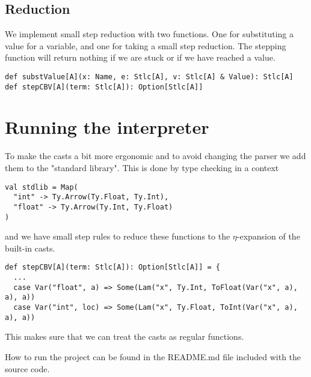 \documentclass[11pt]{article}
\begin{document}
\subsection{Reduction}
We implement small step reduction with two functions. One for substituting a value for a variable, and one for taking a small step reduction. The stepping function will return nothing if we are stuck or if we have reached a value.
\begin{lstlisting}
def substValue[A](x: Name, e: Stlc[A], v: Stlc[A] & Value): Stlc[A]
def stepCBV[A](term: Stlc[A]): Option[Stlc[A]]
\end{lstlisting}

\section{Running the interpreter}
To make the casts a bit more ergonomic and to avoid changing the parser we add them to the "standard library". This is done by type checking in a context
\begin{lstlisting}
val stdlib = Map(
  "int" -> Ty.Arrow(Ty.Float, Ty.Int),
  "float" -> Ty.Arrow(Ty.Int, Ty.Float)
)
\end{lstlisting}
and we have small step rules to reduce these functions to the $\eta$-expansion of the built-in casts.
\begin{lstlisting}
def stepCBV[A](term: Stlc[A]): Option[Stlc[A]] = {
  ...
  case Var("float", a) => Some(Lam("x", Ty.Int, ToFloat(Var("x", a), a), a))
  case Var("int", loc) => Some(Lam("x", Ty.Float, ToInt(Var("x", a), a), a))
\end{lstlisting}
This makes sure that we can treat the casts as regular functions.

How to run the project can be found in the README.md file included with the source code.
\end{document}
